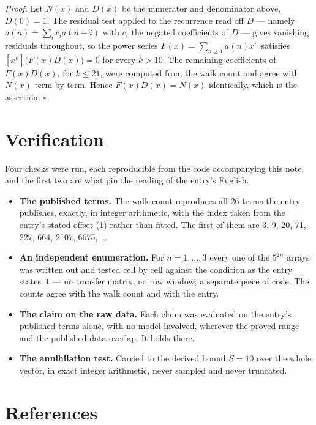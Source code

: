 \documentclass[11pt]{article}
\theoremstyle{definition}
\begin{document}
{\itshape Proof.} Let $N(x)$ and $D(x)$ be the numerator and denominator above, $D(0)=1$. The residual test applied to the recurrence read off $D$ --- namely $a(n) = \sum_i c_i a(n-i)$ with $c_i$ the negated coefficients of $D$ --- gives vanishing residuals throughout, so the power series $F(x)=\sum_{n\ge 1}a(n)x^n$ satisfies $[x^k]\bigl(F(x)D(x)\bigr) = 0$ for every $k > 10$. The remaining coefficients of $F(x)D(x)$, for $k \le 21$, were computed from the walk count and agree with $N(x)$ term by term. Hence $F(x)D(x) = N(x)$ identically, which is the assertion. $\square$

\section{Verification}

Four checks were run, each reproducible from the code accompanying this note, and the first two are what pin the reading of the entry's English.

\begin{itemize}

\item {\bfseries The published terms.} The walk count reproduces all 26 terms the entry publishes, exactly, in integer arithmetic, with the index taken from the entry's stated offset (1) rather than fitted. The first of them are 3, 9, 20, 71, 227, 664, 2107, 6675,~\dots

\item {\bfseries An independent enumeration.} For $n = 1,\dots,3$ every one of the $5^{2n}$ arrays was written out and tested cell by cell against the condition as the entry states it --- no transfer matrix, no row window, a separate piece of code. The counts agree with the walk count and with the entry.

\item {\bfseries The claim on the raw data.} Each claim was evaluated on the entry's published terms alone, with no model involved, wherever the proved range and the published data overlap. It holds there.

\item {\bfseries The annihilation test.} Carried to the derived bound $S = 10$ over the whole vector, in exact integer arithmetic, never sampled and never truncated.

\end{itemize}

\section{References}
\end{document}

